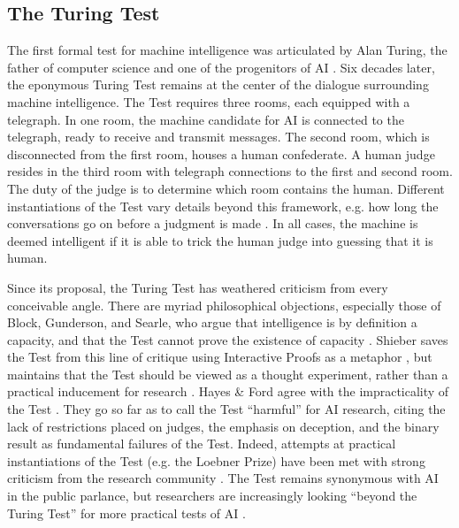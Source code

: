 \subsection{The Turing Test}

The first formal test for machine intelligence was articulated by Alan Turing, the father of computer science and one of the progenitors of AI \cite{turing1950computing}. Six decades later, the eponymous Turing Test remains at the center of the dialogue surrounding machine intelligence. The Test requires three rooms, each equipped with a telegraph. In one room, the machine candidate for AI is connected to the telegraph, ready to receive and transmit messages. The second room, which is disconnected from the first room, houses a human confederate. A human judge resides in the third room with telegraph connections to the first and second room. The duty of the judge is to determine which room contains the human. Different instantiations of the Test vary details beyond this framework, e.g. how long the conversations go on before a judgment is made \cite{loebner2003home, bishop2010testing}. In all cases, the machine is deemed intelligent if it is able to trick the human judge into guessing that it is human.

Since its proposal, the Turing Test has weathered criticism from every conceivable angle. There are myriad philosophical objections, especially those of Block, Gunderson, and Searle, who argue that intelligence is by definition a capacity, and that the Test cannot prove the existence of capacity  \cite{block1980intuitions, gunderson1964vii, searle1980minds}. Shieber saves the Test from this line of critique using Interactive Proofs as a metaphor \cite{shieber2007turing}, but maintains that the Test should be viewed as a thought experiment, rather than a practical inducement for research \cite{shieber2015}. Hayes \& Ford agree with the impracticality of the Test \cite{hayes1995turing}. They go so far as to call the Test ``harmful'' for AI research, citing the lack of restrictions placed on judges, the emphasis on deception, and the binary result as fundamental failures of the Test. Indeed, attempts at practical instantiations of the Test (e.g. the Loebner Prize) have been met with strong criticism from the research community \cite{shieber1994lessons, occasional_pamphlet_2014}. The Test remains synonymous with AI in the public parlance, but researchers are increasingly looking ``beyond the Turing Test'' for more practical tests of AI \cite{1_the_newyorker_2015, you2015beyond}.

